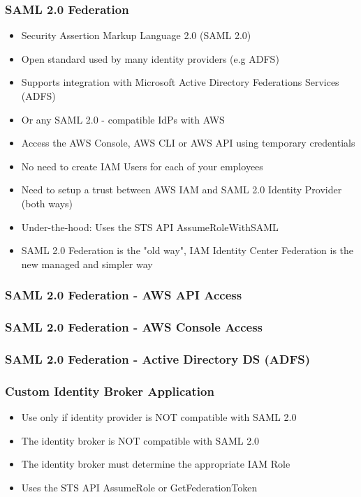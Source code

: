 \subsubsection{SAML 2.0 Federation}
\begin{itemize}
    \item Security Assertion Markup Language 2.0 (SAML 2.0)
    \item Open standard used by many identity providers (e.g ADFS)
    \item Supports integration with Microsoft Active Directory Federations Services (ADFS)
    \item Or any SAML 2.0 - compatible IdPs with AWS
    \item Access the AWS Console, AWS CLI or AWS API using temporary credentials
    \item No need to create IAM Users for each of your employees
    \item Need to setup a trust between AWS IAM and SAML 2.0 Identity Provider (both ways)
    \item Under-the-hood: Uses the STS API AssumeRoleWithSAML
    \item SAML 2.0 Federation is the "old way", IAM Identity Center Federation is the new managed and simpler way
\end{itemize}

\subsubsection{SAML 2.0 Federation - AWS API Access}

\subsubsection{SAML 2.0 Federation - AWS Console Access}

\subsubsection{SAML 2.0 Federation - Active Directory DS (ADFS)}

\subsubsection{Custom Identity Broker Application}
\begin{itemize}
    \item Use only if identity provider is NOT compatible with SAML 2.0
    \item The identity broker is NOT compatible with SAML 2.0
    \item The identity broker must determine the appropriate IAM Role
    \item Uses the STS API AssumeRole or GetFederationToken
\end{itemize}


